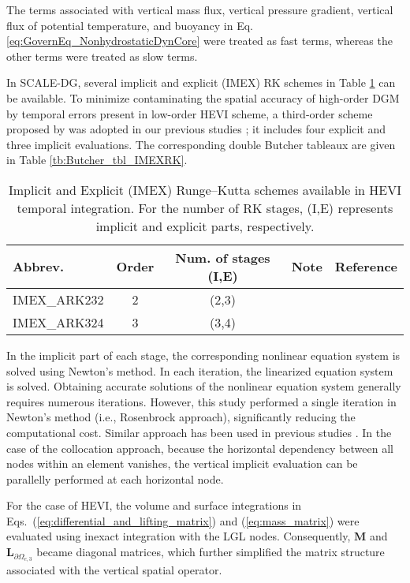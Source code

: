 The terms associated with 
vertical mass flux, 
vertical pressure gradient, 
vertical flux of potential temperature, 
and buoyancy in Eq.\,\eqref{eq:GovernEq_NonhydrostaticDynCore} were treated as fast terms, 
whereas the other terms were treated as slow terms. 


In SCALE-DG, 
several implicit and explicit (IMEX) RK schemes in Table \ref{tb:HEVI_temporal_integ_choice} can be available. 
To minimize contaminating the spatial accuracy of high-order DGM by temporal errors present in low-order HEVI scheme, 
a third-order scheme proposed by \cite{kennedy2003additive} was adopted in our previous studies \citep{KT2025SCALEDG};  
it includes four explicit and three implicit evaluations. 
The corresponding double Butcher tableaux are given in Table \ref{tb:Butcher_tbl_IMEXRK}. 

\begin{table}[t]
\caption{Implicit and Explicit (IMEX) Runge--Kutta schemes available in HEVI temporal integration. 
For the number of RK stages, (I,E) represents implicit and explicit parts, respectively.}
\begin{tabular}{l|cccc}
\hline
Abbrev. & Order & Num. of stages (I,E) & Note & Reference \\
\hline
IMEX\_ARK232 & 2 & (2,3) &  & \cite{Giraldo2013} \\
\hline
IMEX\_ARK324 & 3 & (3,4) &  & \cite{kennedy2003additive} \\
\hline
\end{tabular}
\label{tb:HEVI_temporal_integ_choice}
\end{table}


In the implicit part of each stage, 
the corresponding nonlinear equation system is solved using Newton's method. 
In each iteration, the linearized equation system is solved. 
Obtaining accurate solutions of the nonlinear equation system generally requires numerous iterations. 
However, 
this study performed a single iteration in Newton's method (i.e., Rosenbrock approach), 
significantly reducing the computational cost. 
Similar approach has been used in previous studies \citep{Ullrich2012Resenbrock}. 
In the case of the collocation approach, 
because the horizontal dependency between all nodes within an element vanishes,  
the vertical implicit evaluation can be parallelly performed at each horizontal node. 


For the case of HEVI, 
the volume and surface integrations in Eqs.~(\ref{eq:differential_and_lifting_matrix}) and (\ref{eq:mass_matrix}) 
were evaluated using inexact integration with the LGL nodes. 
Consequently, $\bm{M}$ and $\bm{L}_{\partial \Omega_{e,3}}$ became diagonal matrices, 
which further simplified the matrix structure associated with the vertical spatial operator. 


